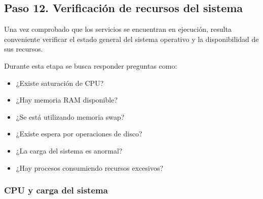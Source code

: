 \documentclass[a4paper,10pt]{article}
\begin{document}

\subsection{Paso 12. Verificación de recursos del sistema}

Una vez comprobado que los servicios se encuentran en ejecución, resulta
conveniente verificar el estado general del sistema operativo y la
disponibilidad de sus recursos.

Durante esta etapa se busca responder preguntas como:

\begin{itemize}
\item ¿Existe saturación de CPU?
\item ¿Hay memoria RAM disponible?
\item ¿Se está utilizando memoria swap?
\item ¿Existe espera por operaciones de disco?
\item ¿La carga del sistema es anormal?
\item ¿Hay procesos consumiendo recursos excesivos?
\end{itemize}


\subsubsection{CPU y carga del sistema}
\end{document}
